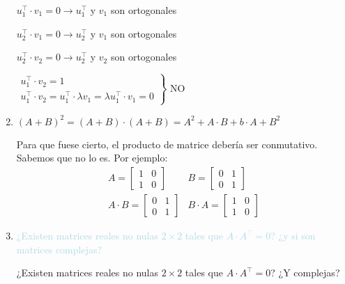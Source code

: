 \begin{enumerate}[label=\color{red}\textbf{\arabic*)}, leftmargin=*]
	$u_1^\intercal \cdot v_1=0\rightarrow u_1^\intercal $ y $v_1$ son ortogonales
	
	$u_2^\intercal \cdot v_1=0\rightarrow u_2^\intercal $ y $v_1$ son ortogonales
	
	$u_2^\intercal \cdot v_2=0\rightarrow u_2^\intercal $ y $v_2$ son ortogonales
	
	$\left.\begin{array}{l}
		u_1^\intercal \cdot v_2=1\\
		u_1^\intercal \cdot v_2=u_1^\intercal \cdot\lambda v_1=\lambda u_1^\intercal
		\cdot v_1=0
	\end{array}\right\}$ NO
	\item {}
	
	$(A+B)^2=(A+B)\cdot(A+B)=A^2+A\cdot B+b\cdot A+B^2$
	
	Para que fuese cierto, el producto de matrice debería ser conmutativo. Sabemos
	que no lo es. Por ejemplo:\[ \begin{array}{ll}
		A=\begin{bmatrix}
			1 &0\\
			1 & 0
		\end{bmatrix} & B=\begin{bmatrix}
			0 & 1\\
			0 & 1
		\end{bmatrix}\\
		A\cdot B=\begin{bmatrix}
			0 & 1\\
			0 & 1
		\end{bmatrix} & B\cdot A=\begin{bmatrix}
			1 &0 \\
			1 & 0
		\end{bmatrix}
	\end{array} \]
	\item \textcolor{lightblue}{¿Existen matrices reales no nulas $2\times 2$ tales
		que $A\cdot A^\intercal =0$? ¿y si son matrices complejas?}
	
	¿Existen matrices reales no nulas $2\times 2$ tales que $A\cdot A^\intercal
	=0$? ¿Y complejas?
	

\end{enumerate}
